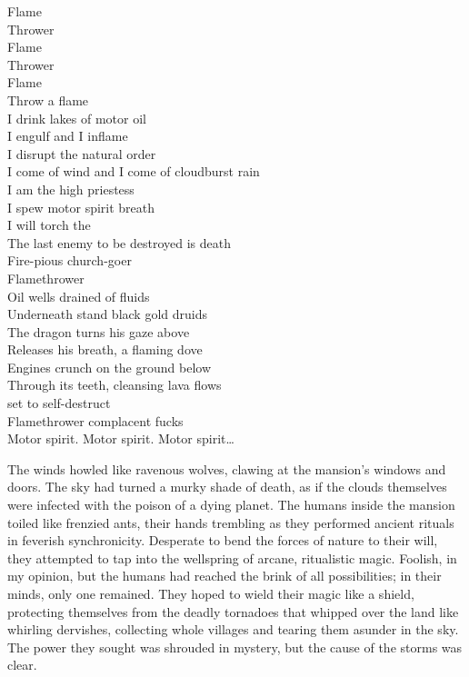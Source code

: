 Flame \\
Thrower \\
Flame \\
Thrower \\
Flame \\
Throw a flame \\

I drink lakes of motor oil \\
I engulf and I inflame \\
I disrupt the natural order \\
I come of wind and I come of cloudburst rain \\
I am the high priestess \\
I spew motor spirit breath \\
I will torch the  \\
The last enemy to be destroyed is death \\
Fire-pious church-goer \\
Flamethrower \\

Oil wells drained of fluids \\
Underneath stand black gold druids \\
The dragon turns his gaze above \\
Releases his breath, a flaming dove \\
Engines crunch on the ground below \\
Through its teeth, cleansing lava flows \\
 set to self-destruct \\
Flamethrower complacent fucks \\

Motor spirit. Motor spirit. Motor spirit… \\



The winds howled like ravenous wolves, clawing at the mansion's windows and doors. The sky had turned a murky shade of death, as if the clouds themselves were infected with the poison of a dying planet. The humans inside the mansion toiled like frenzied ants, their hands trembling as they performed ancient rituals in feverish synchronicity. Desperate to bend the forces of nature to their will, they attempted to tap into the wellspring of arcane, ritualistic magic. Foolish, in my opinion, but the humans had reached the brink of all possibilities; in their minds, only one remained. They hoped to wield their magic like a shield, protecting themselves from the deadly tornadoes that whipped over the land like whirling dervishes, collecting whole villages and tearing them asunder in the sky. The power they sought was shrouded in mystery, but the cause of the storms was clear. \\

